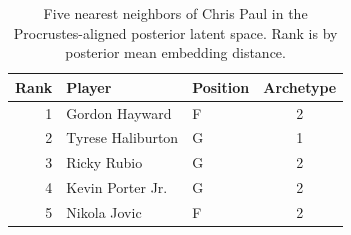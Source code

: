 \begin{table}[htbp]
  \centering\small
  \begin{tabular}{rllc}
    \toprule
    Rank & Player & Position & Archetype \\
    \midrule
    1 & Gordon Hayward & F & 2 \\
    2 & Tyrese Haliburton & G & 1 \\
    3 & Ricky Rubio & G & 2 \\
    4 & Kevin Porter Jr. & G & 2 \\
    5 & Nikola Jovic & F & 2 \\
    \bottomrule
  \end{tabular}
  \caption{Five nearest neighbors of Chris Paul in the Procrustes-aligned posterior latent space. Rank is by posterior mean embedding distance.}
  \label{tab:Chris_Paul_neighbors}
\end{table}

